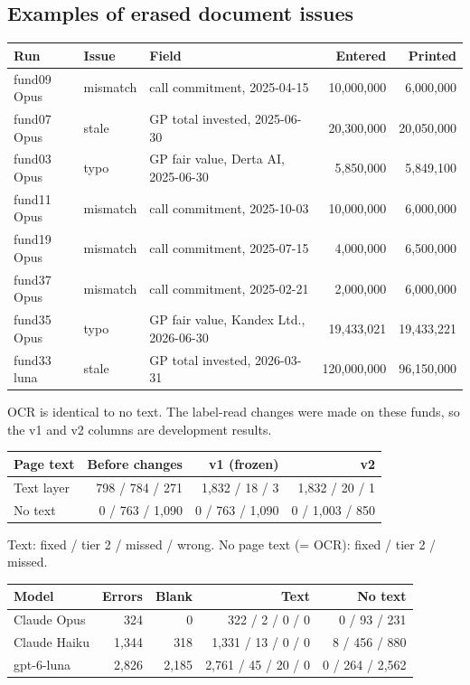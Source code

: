 \subsection{Examples of erased document issues}\label{app:erased}
\begin{center}
\begin{tabular}{lllrr}
\toprule
Run & Issue & Field & Entered & Printed \\
\midrule
fund09 Opus & mismatch & call commitment, 2025-04-15 & 10,000,000 & 6,000,000 \\
fund07 Opus & stale & GP total invested, 2025-06-30 & 20,300,000 & 20,050,000 \\
fund03 Opus & typo & GP fair value, Derta AI, 2025-06-30 & 5,850,000 & 5,849,100 \\
fund11 Opus & mismatch & call commitment, 2025-10-03 & 10,000,000 & 6,000,000 \\
fund19 Opus & mismatch & call commitment, 2025-07-15 & 4,000,000 & 6,500,000 \\
fund37 Opus & mismatch & call commitment, 2025-02-21 & 2,000,000 & 6,000,000 \\
fund35 Opus & typo & GP fair value, Kandex Ltd., 2026-06-30 & 19,433,021 & 19,433,221 \\
fund33 luna & stale & GP total invested, 2026-03-31 & 120,000,000 & 96,150,000 \\
\bottomrule
\end{tabular}
\end{center}


\label{tab:dev} OCR is identical to no text. The label-read changes were made on these funds, so the v1 and v2 columns are development results.
\begin{center}
\begin{tabular}{lrrr}
\toprule
Page text & Before changes & v1 (frozen) & v2 \\
\midrule
Text layer & 798 / 784 / 271 & 1,832 / 18 / 3 & 1,832 / 20 / 1 \\
No text & 0 / 763 / 1,090 & 0 / 763 / 1,090 & 0 / 1,003 / 850 \\
\bottomrule
\end{tabular}
\end{center}

\label{tab:ho1} Text: fixed / tier 2 / missed / wrong. No page text (= OCR): fixed / tier 2 / missed.
\begin{center}
\begin{tabular}{lrrrr}
\toprule
Model & Errors & Blank & Text & No text \\
\midrule
Claude Opus & 324 & 0 & 322 / 2 / 0 / 0 & 0 / 93 / 231 \\
Claude Haiku & 1,344 & 318 & 1,331 / 13 / 0 / 0 & 8 / 456 / 880 \\
gpt-6-luna & 2,826 & 2,185 & 2,761 / 45 / 20 / 0 & 0 / 264 / 2,562 \\
\bottomrule
\end{tabular}
\end{center}

